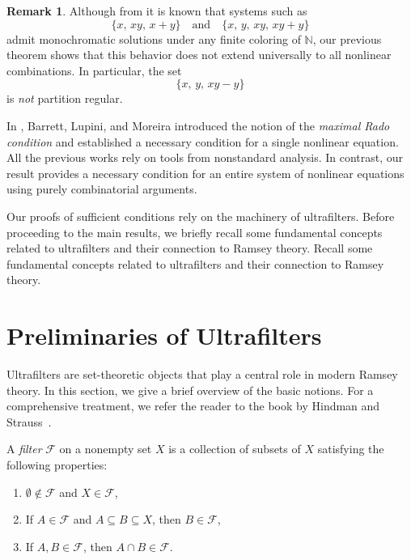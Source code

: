 \documentclass{article}
\theoremstyle{Theorem}
\theoremstyle{definition}
\newtheorem{rem}[thm]{Remark}
\begin{document}
\begin{rem}
Although from \cite{anal, G25} it is known that systems such as 
\[
\{x,\, xy,\, x + y\} \quad \text{and} \quad \{x,\, y,\, xy,\, xy + y\}
\]
admit monochromatic solutions under any finite coloring of \( \mathbb{N} \), our previous theorem shows that this behavior does not extend universally to all nonlinear combinations. In particular, the set 
\[
\{x,\, y,\, xy - y\}
\] 
is \emph{not} partition regular.
\end{rem}




In \cite{BLM}, Barrett, Lupini, and Moreira introduced the notion of the \emph{maximal Rado condition} and established a necessary condition for a single nonlinear equation. All the previous works rely on tools from nonstandard analysis. In contrast, our result provides a necessary condition for an entire system of nonlinear equations using purely combinatorial arguments.





Our proofs of sufficient conditions rely on the machinery of ultrafilters. Before proceeding to the main results, we briefly recall some fundamental concepts related to ultrafilters and their connection to Ramsey theory. Recall some fundamental concepts related to ultrafilters and their connection to Ramsey theory.

\section{Preliminaries of Ultrafilters}

 Ultrafilters are set-theoretic objects that play a central role in modern Ramsey theory. In this section, we give a brief overview of the basic notions. For a comprehensive treatment, we refer the reader to the book by Hindman and Strauss~\cite{book}.

A \emph{filter} \( \mathcal{F} \) on a nonempty set \( X \) is a collection of subsets of \( X \) satisfying the following properties:
\begin{enumerate}
    \item \( \emptyset \notin \mathcal{F} \) and \( X \in \mathcal{F} \),
    \item If \( A \in \mathcal{F} \) and \( A \subseteq B \subseteq X \), then \( B \in \mathcal{F} \),
    \item If \( A, B \in \mathcal{F} \), then \( A \cap B \in \mathcal{F} \).
\end{enumerate}
\end{document}
